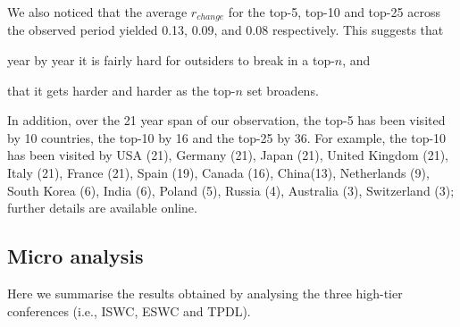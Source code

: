 \documentclass{llncs}
\begin{document}
We also noticed that the average $r_{change}$ for the top-5, top-10 and top-25 across the observed period yielded 0.13, 0.09, and 0.08 respectively. This suggests that 
\begin{enumerate*}[label=(\roman*)]
\item year by year it is fairly hard for outsiders to break in a top-$n$, and 
\item that it gets harder and harder as the top-$n$ set broadens.
\end{enumerate*}
In addition, over the 21 year span of our observation, the top-5 has been visited by 10 countries, the top-10 by 16 and the top-25 by 36. 
For example, the top-10 has been visited by USA (21), Germany (21), Japan (21), United Kingdom (21), Italy (21), France (21), Spain (19), Canada (16), China(13), Netherlands (9), South Korea (6), India (6), Poland (5), Russia (4), Australia (3), Switzerland (3); further details are available  online.




\subsection{Micro analysis}
Here we summarise the results obtained by analysing the three high-tier conferences (i.e., ISWC, ESWC and TPDL).


\end{document}
